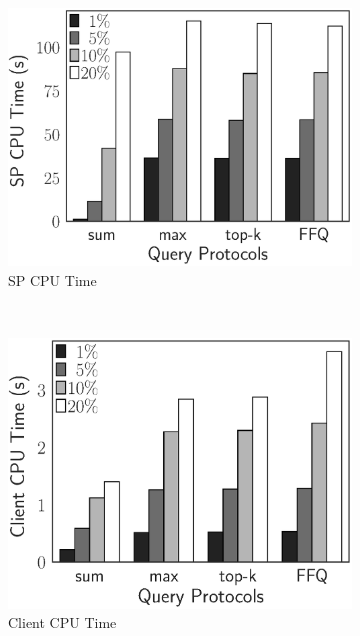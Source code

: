 \begin{figure}[t]
  \centering
  \begin{subfigure}[b]{.31\linewidth}
    \centering
    \includegraphics[width=\linewidth]{exp-figs/aggregate-queries/foodmarket_sp.eps}
    \caption{SP CPU Time}
  \end{subfigure}~%
  \begin{subfigure}[b]{.3\linewidth}
    \centering
    \includegraphics[width=\linewidth]{exp-figs/aggregate-queries/foodmarket_client.eps}
    \caption{Client CPU Time}
  \end{subfigure}~%
  \begin{subfigure}[b]{.37\linewidth}
    \centering

\end{subfigure}
\end{figure}
